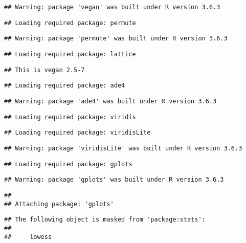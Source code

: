 \documentclass[
]{article}
\begin{document}
\begin{verbatim}
## Warning: package 'vegan' was built under R version 3.6.3
\end{verbatim}

\begin{verbatim}
## Loading required package: permute
\end{verbatim}

\begin{verbatim}
## Warning: package 'permute' was built under R version 3.6.3
\end{verbatim}

\begin{verbatim}
## Loading required package: lattice
\end{verbatim}

\begin{verbatim}
## This is vegan 2.5-7
\end{verbatim}

\begin{verbatim}
## Loading required package: ade4
\end{verbatim}

\begin{verbatim}
## Warning: package 'ade4' was built under R version 3.6.3
\end{verbatim}

\begin{verbatim}
## Loading required package: viridis
\end{verbatim}

\begin{verbatim}
## Loading required package: viridisLite
\end{verbatim}

\begin{verbatim}
## Warning: package 'viridisLite' was built under R version 3.6.3
\end{verbatim}

\begin{verbatim}
## Loading required package: gplots
\end{verbatim}

\begin{verbatim}
## Warning: package 'gplots' was built under R version 3.6.3
\end{verbatim}

\begin{verbatim}
## 
## Attaching package: 'gplots'
\end{verbatim}

\begin{verbatim}
## The following object is masked from 'package:stats':
## 
##     lowess
\end{verbatim}
\end{document}
